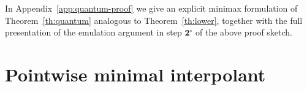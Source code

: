 \documentclass[11pt]{article}
\numberwithin{equation}{section}
\let\le\leqslant
\theoremstyle{remark}
\newcommand{\proofstep}[1]{$\textbf{#1}^{\circ}$}
\newcommand{\R}{\mathbb{R}}
\newcommand{\inner}[2]{\langle #1,#2\rangle}
\newcommand{\ri}{\operatorname{ri}}
\newcommand{\Diag}{\textup{Diag}}
\newcommand{\Pin}{\mathsf{\Pi}}
\newcommand{\Mtd}{\mathscr{M}}
\newcommand{\FOM}{\textsf{FOM}}
\let\Div\relax\newcommand{\Div}{D_h}
\newcommand{\Simp}{\Delta_d}
\newcommand{\Herm}{\mathbf{H}^d}
\newcommand{\Dens}{\boldsymbol{\Delta}_d}
\newcommand{\qre}[2]{D_{h \hspace{1pt} \circ \lambda}(#1,#2)}
\DeclareMathOperator{\diag}{diag}
\newcommand{\1}{\mathbf{1}}
\newcommand{\bnabla}{\nabla}
\begin{document}
%
In Appendix~\ref{app:quantum-proof} we give an explicit minimax formulation of Theorem~\ref{th:quantum} analogous to Theorem~\ref{th:lower}, together with the full presentation of the emulation argument in step \proofstep{2} of the above proof sketch.

%
%
\section{Pointwise minimal interpolant}
\label{sec:outro}
\end{document}
